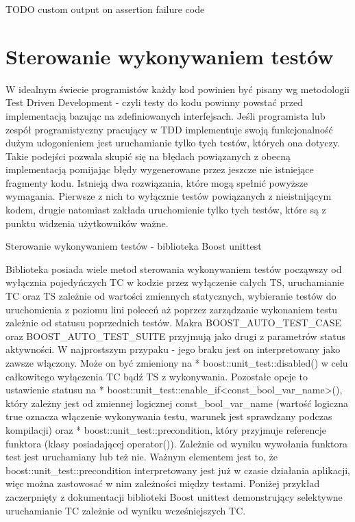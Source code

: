 \documentclass[12pt,a4paper,notitlepage]{report}
\begin{document}
TODO custom output on assertion failure code

\chapter{Sterowanie wykonywaniem testów}

W idealnym świecie programistów każdy kod powinien być pisany wg metodologii Test Driven Development - czyli testy do kodu powinny powstać przed implementacją bazując na zdefiniowanych interfejsach.
Jeśli programista lub zespół programistyczny pracujący w TDD implementuje swoją funkcjonalność dużym udogonieniem jest uruchamianie tylko tych testów, których ona dotyczy. Takie podejści pozwala skupić się na błędach powiązanych z obecną implementacją pomijając błędy wygenerowane przez jeszcze nie istniejące fragmenty kodu.
Istnieją dwa rozwiązania, które mogą spełnić powyższe wymagania. Pierwsze z nich to wyłącznie testów powiązanych z nieistnijącym kodem, drugie natomiast zakłada uruchomienie tylko tych testów, które są z punktu widzenia użytkowników ważne.

Sterowanie wykonywaniem testów - biblioteka Boost unittest

Biblioteka posiada wiele metod sterowania wykonywaniem testów począwszy od wyłącznia pojedyńczych TC w kodzie przez wyłączenie całych TS, uruchamianie TC oraz TS zależnie od wartości zmiennych statycznych, wybieranie testów do uruchomienia z poziomu lini poleceń aż poprzez zarządzanie wykonaniem testu zależnie od statusu poprzednich testów.
Makra BOOST_AUTO_TEST_CASE oraz BOOST_AUTO_TEST_SUITE przyjmują jako drugi z parametrów status aktywności.
W najprostszym przypaku - jego braku jest on interpretowany jako zawsze włączony. Może on być zmieniony na * boost::unit_test::disabled() w celu całkowitego wyłączenia TC bądź TS z wykonywania. 
Pozostałe opcje to ustawienie statusu na * boost::unit_test::enable_if<const_bool_var_name>(), który zależny jest od zmiennej logicznej const_bool_var_name (wartość logiczna true oznacza włączenie wykonywania testu, warunek jest sprawdzany podczas kompilacji) oraz * boost::unit_test::precondition, który przyjmuje referencje funktora (klasy posiadającej operator()). Zależnie od wyniku wywołania funktora test jest uruchamiany lub też nie. Ważnym elementem jest to, że boost::unit_test::precondition interpretowany jest już w czasie działania aplikacji, więc można zastowosać w nim zależności między testami.
Poniżej przykład zaczerpnięty z dokumentacji biblioteki Boost unittest demonstrujący selektywne uruchamianie TC zależnie od wyniku wcześniejszych TC.
\end{document}
